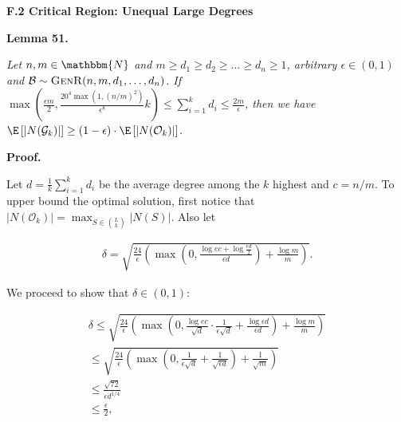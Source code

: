 \par\medskip\noindent\textbf{F.2 Critical Region: Unequal Large Degrees}\par





\par\medskip\noindent\textbf{\textbf{Lemma 51}\textbf{.}}\par



\emph{Let $n,m\in\mathbbm{N}$ and $m\geq d_{1}\geq d_{2}\geq\dots\geq d_{n}\geq 1$, arbitrary $\epsilon\in(0,1)$ and $\mathcal{B}\sim\textsc{GenR}(n,m,d_{1},\dots,d_{n})$.
If $\max\left(\frac{\epsilon m}{2},\frac{20^{4}\max(1,(n/m)^{2})}{\epsilon^{8}}k\right)\leq\sum_{i=1}^{k}d_{i}\leq\frac{2m}{\epsilon}$, then we have $\E\left[|N(\mathcal{G}_{k})|\right]\geq\left(1-\epsilon\right)\cdot\E\left[|N(\mathcal{O}_{k})|\right]$.}\par






\par\medskip\noindent\textbf{Proof.}\par



Let $d=\frac{1}{k}\sum_{i=1}^{k}{d_{i}}$ be the average degree among the $k$ highest and $c=n/m$.
To upper bound the optimal solution, first notice that $|N(\mathcal{O}_{k})|=\max_{S\in\binom{L}{k}}|N(S)|$.
Also let\par


\[\begin{gathered}
\delta=\sqrt{\frac{24}{\epsilon}\left(\max\left(0,\frac{\log{ec}+\log{\frac{\epsilon d}{2}}}{\epsilon d}\right)+\frac{\log{m}}{m}\right)}.
\end{gathered}\]


We proceed to show that $\delta\in(0,1)$:\par


\[\begin{gathered}
\displaystyle\delta \displaystyle\leq\sqrt{\frac{24}{\epsilon}\left(\max\left(0,\frac{\log{ec}}{\sqrt{d}}\cdot\frac{1}{\epsilon\sqrt{d}}+\frac{\log{\epsilon d}}{\epsilon d}\right)+\frac{\log{m}}{m}\right)} \\
\displaystyle\leq\sqrt{\frac{24}{\epsilon}\left(\max\left(0,\frac{1}{\epsilon\sqrt{d}}+\frac{1}{\sqrt{\epsilon d}}\right)+\frac{1}{\sqrt{m}}\right)} \\
\displaystyle\leq\frac{\sqrt{72}}{\epsilon d^{1/4}} \\
\displaystyle\leq\frac{\epsilon}{2},
\end{gathered}\]


